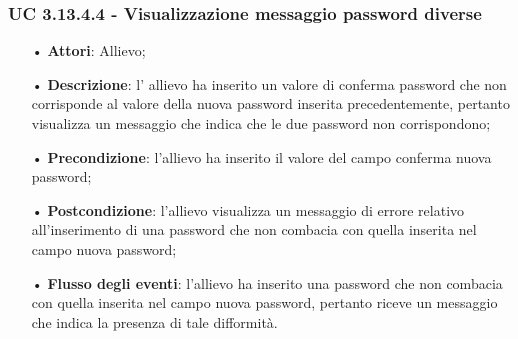 \subsubsection{UC 3.13.4.4 - Visualizzazione messaggio password diverse}
\begin{itemize}
	\item[•]\textbf{Attori}: Allievo;
	\item[•]\textbf{Descrizione}: l' allievo ha inserito un valore di conferma password che non corrisponde al valore della nuova password inserita precedentemente, pertanto visualizza un messaggio che indica che le due password non corrispondono;
	\item[•]\textbf{Precondizione}: l'allievo ha inserito il valore del campo conferma nuova password;
	\item[•]\textbf{Postcondizione}: l'allievo visualizza un messaggio di errore relativo all'inserimento di una password che non combacia con quella inserita nel campo nuova password; 
	\item[•]\textbf{Flusso degli eventi}: l'allievo ha inserito una password che non combacia con quella inserita nel campo nuova password, pertanto riceve un messaggio che indica la presenza di tale difformità.
\end{itemize}